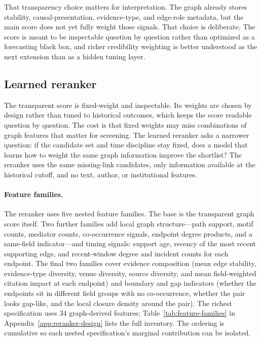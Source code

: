 \documentclass[11pt]{article}
\begin{document}
That transparency choice matters for interpretation. The graph already stores stability,
causal-presentation, evidence-type, and edge-role metadata, but the main score does not yet
fully weight those signals. That choice is deliberate. The score is meant to be inspectable question by question rather
than optimized as a forecasting black box, and richer credibility weighting is better
understood as the next extension than as a hidden tuning layer.

\subsection{Learned reranker}
\label{sec:reranker-design}

The transparent score is fixed-weight and inspectable. Its weights are chosen by design rather than tuned to historical outcomes, which keeps the score readable question by question. The cost is that fixed weights may miss combinations of graph features that matter for screening. The learned reranker asks a narrower question: if the candidate set and time discipline stay fixed, does a model that learns how to weight the same graph information improve the shortlist? The reranker uses the same missing-link candidates, only information available at the historical cutoff, and no text, author, or institutional features.

\paragraph{Feature families.}
The reranker uses five nested feature families. The base is the transparent graph score itself. Two further families add local graph structure---path support, motif counts, mediator counts, co-occurrence signals, endpoint degree products, and a same-field indicator---and timing signals: support age, recency of the most recent supporting edge, and recent-window degree and incident counts for each endpoint. The final two families cover evidence composition (mean edge stability, evidence-type diversity, venue diversity, source diversity, and mean field-weighted citation impact at each endpoint) and boundary and gap indicators (whether the endpoints sit in different field groups with no co-occurrence, whether the pair looks gap-like, and the local closure density around the pair). The richest specification uses 34 graph-derived features; Table~\ref{tab:feature-families} in Appendix~\ref{app:reranker-design} lists the full inventory. The ordering is cumulative so each nested specification's marginal contribution can be isolated.
\end{document}
